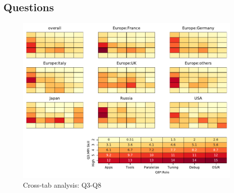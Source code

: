 
\subsection{Questions}


\begin{figure}
\begin{center}
\includegraphics[width=12cm]{../pdfs/Q3-Q8.pdf}
\caption{Cross-tab analysis: Q3-Q8}
\label{fig:Q3-Q8}
\end{center}
\end{figure}
